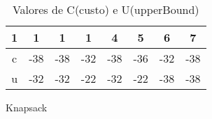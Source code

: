 \begin{table}[ht]
    \centering
    \begin{tabular}{|c|c|c|c|c|c|c|c|}
    \hline
    1 & 1 & 1 & 1 & 4   & 5   & 6   & 7   \\ 
    \hline
    c                       & -38                    & -38                    & -32                    & -38 & -36 & -32 & -38 \\
    \hline
    u                       & -32                    & -32                    & -22                    & -32 & -22 & -38 & -38 \\
    \hline
    \end{tabular}
    \caption{Valores de C(custo) e U(upperBound)}
\end{table}

\begin{algorithm}
    \caption{Knapsack}
    \begin{algorithmic}[1]
    \EndIf
    \EndIf
    \Else 
    \EndIf
    \EndFor
    \EndProcedure
    \end{algorithmic}
  \end{algorithm}

  \nocite{branch-and-bound}
  \nocite{knapsacker}

  \newpage